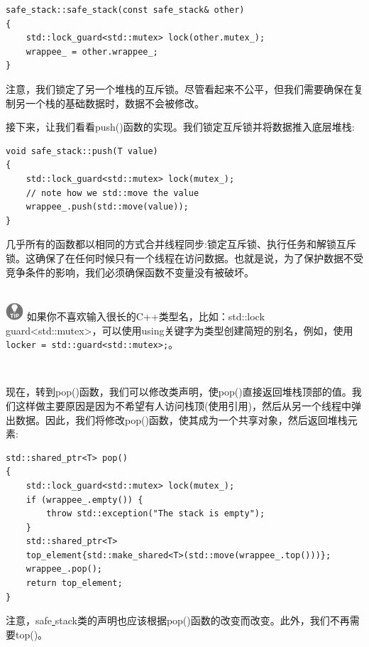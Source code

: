 \begin{lstlisting}[caption={}]
safe_stack::safe_stack(const safe_stack& other)
{
	std::lock_guard<std::mutex> lock(other.mutex_);
	wrappee_ = other.wrappee_;
}
\end{lstlisting}

注意，我们锁定了另一个堆栈的互斥锁。尽管看起来不公平，但我们需要确保在复制另一个栈的基础数据时，数据不会被修改。 \par
接下来，让我们看看push()函数的实现。我们锁定互斥锁并将数据推入底层堆栈: \par

\begin{lstlisting}[caption={}]
void safe_stack::push(T value)
{
	std::lock_guard<std::mutex> lock(mutex_);
	// note how we std::move the value
	wrappee_.push(std::move(value));
}
\end{lstlisting}

几乎所有的函数都以相同的方式合并线程同步:锁定互斥锁、执行任务和解锁互斥锁。这确保了在任何时候只有一个线程在访问数据。也就是说，为了保护数据不受竞争条件的影响，我们必须确保函数不变量没有被破坏。 \par

\hspace*{\fill} \\ %
\includegraphics[width=0.05\textwidth]{images/tip}
如果你不喜欢输入很长的C++类型名，比如：std::lock\underline{ }guard<std::mutex>，可以使用using关键字为类型创建简短的别名，例如，使用\texttt{locker = std::guard<std::mutex>;}。 \par
\noindent\textbf{}\ \par

现在，转到pop()函数，我们可以修改类声明，使pop()直接返回堆栈顶部的值。我们这样做主要原因是因为不希望有人访问栈顶(使用引用)，然后从另一个线程中弹出数据。因此，我们将修改pop()函数，使其成为一个共享对象，然后返回堆栈元素: \par

\begin{lstlisting}[caption={}]
std::shared_ptr<T> pop()
{
	std::lock_guard<std::mutex> lock(mutex_);
	if (wrappee_.empty()) {
		throw std::exception("The stack is empty");
	}
	std::shared_ptr<T>
	top_element{std::make_shared<T>(std::move(wrappee_.top()))};
	wrappee_.pop();
	return top_element;
}
\end{lstlisting}

注意，safe\underline{ }stack类的声明也应该根据pop()函数的改变而改变。此外，我们不再需要top()。 \par

